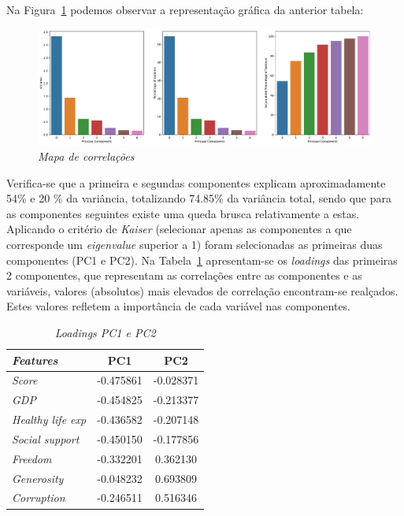 \documentclass[12pt, a4paper]{article}
\begin{document}
Na Figura~\ref{fig:fig7} podemos observar a representação gráfica da anterior
tabela:

\begin{figure}[h]
\includegraphics[scale=0.37]{PrincipalComponents.pdf}
\centering
\caption{\emph{Mapa de correlações}}
\label{fig:fig7}
\end{figure}

Verifica-se que a primeira e segundas componentes explicam
aproximadamente 54\% e 20 \% da variância, totalizando 74.85\% da
variância total, sendo que para as componentes seguintes existe uma
queda brusca relativamente a estas. Aplicando o critério de \emph{Kaiser}
(selecionar apenas as componentes a que corresponde um \emph{eigenvalue}
superior a 1) foram selecionadas as primeiras duas componentes (PC1 e
PC2). Na Tabela~\ref{tab:tab4} apresentam-se os \emph{loadings} das primeiras 2 componentes, que representam as
correlações entre as componentes e as variáveis, valores (absolutos)
mais elevados de correlação encontram-se realçados. Estes valores
refletem a importância de cada variável nas componentes.


\begin{table}[h]
\centering
\begin{tabular}{|l|c|c|}
\hline
\textit{\textbf{Features}} & \textbf{PC1} & \textbf{PC2} \\ \hline
\textit{Score} & \cellcolor[HTML]{FFCC67}-0.475861 & -0.028371 \\ \hline
\textit{GDP} & \cellcolor[HTML]{FFCC67}-0.454825 & -0.213377 \\ \hline
\textit{Healthy life exp} & \cellcolor[HTML]{FFCC67}-0.436582 & -0.207148 \\ \hline
\textit{Social support} & \cellcolor[HTML]{FFCC67}-0.450150 & -0.177856 \\ \hline
\textit{Freedom} & -0.332201 & 0.362130 \\ \hline
\textit{Generosity} & -0.048232 & \cellcolor[HTML]{FFCC67}0.693809 \\ \hline
\textit{Corruption} & -0.246511 & \cellcolor[HTML]{FFCC67}0.516346 \\ \hline
\end{tabular}
\caption{\emph{Loadings PC1 e PC2}}
\label{tab:tab4}
\end{table}
\end{document}
